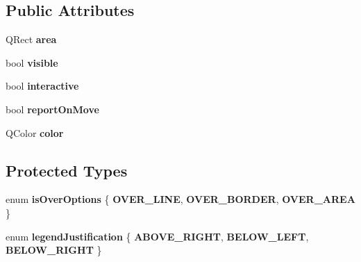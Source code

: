\subsection*{Public Attributes}
\begin{DoxyCompactItemize}
\item 
\hypertarget{classmarkupItem_aa304f00daed9abc810365cd4eb2294a1}{
QRect {\bfseries area}}
\label{classmarkupItem_aa304f00daed9abc810365cd4eb2294a1}

\item 
\hypertarget{classmarkupItem_a38fabe02da5b2e15efe09eb9b566e67f}{
bool {\bfseries visible}}
\label{classmarkupItem_a38fabe02da5b2e15efe09eb9b566e67f}

\item 
\hypertarget{classmarkupItem_afabb42384d20352200aa5eb651093eac}{
bool {\bfseries interactive}}
\label{classmarkupItem_afabb42384d20352200aa5eb651093eac}

\item 
\hypertarget{classmarkupItem_a7a169f1f96eaee1551ed75ef9073789e}{
bool {\bfseries reportOnMove}}
\label{classmarkupItem_a7a169f1f96eaee1551ed75ef9073789e}

\item 
\hypertarget{classmarkupItem_a9711a70a7cc88b7a64742b6f2273c3f3}{
QColor {\bfseries color}}
\label{classmarkupItem_a9711a70a7cc88b7a64742b6f2273c3f3}

\end{DoxyCompactItemize}
\subsection*{Protected Types}
\begin{DoxyCompactItemize}
\item 
enum {\bfseries isOverOptions} \{ {\bfseries OVER\_\-LINE}, 
{\bfseries OVER\_\-BORDER}, 
{\bfseries OVER\_\-AREA}
 \}
\item 
enum {\bfseries legendJustification} \{ {\bfseries ABOVE\_\-RIGHT}, 
{\bfseries BELOW\_\-LEFT}, 
{\bfseries BELOW\_\-RIGHT}
 \}
\end{DoxyCompactItemize}
